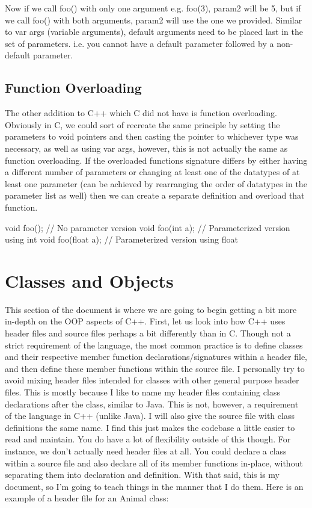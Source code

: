 \documentclass{article}
\begin{document}
Now if we call foo() with only one argument e.g. foo(3), param2 will be 5, but if we call foo() with both
arguments, param2 will use the one we provided. Similar to var args (variable arguments), default arguments
need to be placed last in the set of parameters. i.e. you cannot have a default parameter followed by a
non-default parameter.

\subsection{Function Overloading}

The other addition to C++ which C did not have is function overloading. Obviously in C, we could sort of
recreate the same principle by setting the parameters to void pointers and then casting the pointer to whichever
type was necessary, as well as using var args, however, this is not actually the same as function overloading.
If the overloaded functions signature differs by either having a different number of parameters or changing at
least one of the datatypes of at least one parameter (can be achieved by rearranging the order of datatypes in
the parameter list as well) then we can create a separate definition and overload that function.

\begin{cpplst}
void foo();         // No parameter version
void foo(int a);    // Parameterized version using int
void foo(float a);  // Parameterized version using float
\end{cpplst}

\section{Classes and Objects}

This section of the document is where we are going to begin getting a bit more in-depth on the OOP aspects of
C++. First, let us look into how C++ uses header files and source files perhaps a bit differently than in C.
Though not a strict requirement of the language, the most common practice is to define classes and their
respective member function declarations/signatures within a header file, and then define these member functions
within the source file. I personally try to avoid mixing header files intended for classes with other general
purpose header files. This is mostly because I like to name my header files containing class declarations after
the class, similar to Java. This is not, however, a requirement of the language in C++ (unlike Java). I will
also give the source file with class definitions the same name. I find this just makes the codebase a little
easier to read and maintain. You do have a lot of flexibility outside of this though. For instance, we don't
actually need header files at all. You could declare a class within a source file and also declare all of its
member functions in-place, without separating them into declaration and definition. With that said, this is
my document, so I’m going to teach things in the manner that I do them. Here is an example of a header file
for an Animal class:
\end{document}
